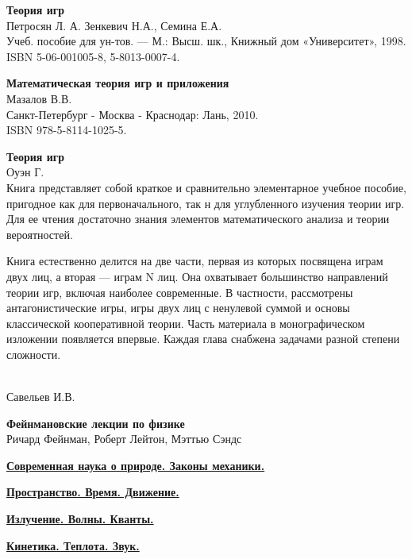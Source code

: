 \begin{thebibliography}{99}

\textbf{Теория игр}\\
Петросян Л. А. Зенкевич Н.А., Семина Е.А.\\
Учеб. пособие для ун-тов. — М.: Высш.
шк., Книжный дом «Университет», 1998.\\
ISBN 5-06-001005-8, 5-8013-0007-4.

\textbf{Математическая теория игр и приложения}\\
Мазалов В.В.\\
Санкт-Петербург - Москва - Краснодар: Лань, 2010.\\
ISBN 978-5-8114-1025-5.

\textbf{Теория игр}\\
Оуэн Г.\\
Книга представляет собой краткое и сравнительно элементарное учебное пособие,
пригодное как для первоначального, так н для углубленного изучения теории игр.
Для ее чтения достаточно знания элементов математического анализа и теории
вероятностей.

Книга естественно делится на две части, первая из которых посвящена играм двух
лиц, а вторая — играм N лиц. Она охватывает большинство направлений теории игр,
включая наиболее современные. В частности, рассмотрены антагонистические игры,
игры двух лиц с ненулевой суммой и основы классической кооперативной теории.
Часть материала в монографическом изложении появляется впервые. Каждая глава
снабжена задачами разной степени сложности.



 \\
Савельев И.В.

\textbf{Фейнмановские лекции по физике}\\
Ричард Фейнман, Роберт Лейтон, Мэттью Сэндс

\href{https://drive.google.com/file/d/0B0u4WeMjO894SG9RdUtzZWVhQ1E/view?usp=sharing}{\textbf{Современная
наука о природе. Законы механики.}}

\href{https://drive.google.com/file/d/0B0u4WeMjO894NjRqckpvM19hQVE/view?usp=sharing}{\textbf{Пространство. Время. Движение.}}

 \href{}{\textbf{Излучение. Волны. Кванты.}}

 \href{}{\textbf{Кинетика. Теплота. Звук.}}


\end{thebibliography}
